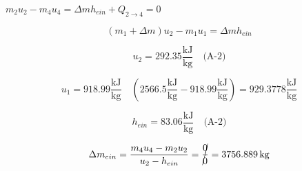 

\item[d)] $m_2 u_2 - m_4 u_4 = \Delta m h_{ein} + Q_{2 \rightarrow 4} = 0$
    
    \[
    (m_1 + \Delta m) u_2 - m_1 u_1 = \Delta m h_{ein}
    \]
    
    \[
    u_2 = 292.35 \frac{\text{kJ}}{\text{kg}} \quad \text{(A-2)}
    \]
    
    \[
    u_1 = 918.99 \frac{\text{kJ}}{\text{kg}} \quad (2566.5 \frac{\text{kJ}}{\text{kg}} - 918.99 \frac{\text{kJ}}{\text{kg}}) = 929.3778 \frac{\text{kJ}}{\text{kg}}
    \]
    
    \[
    h_{ein} = 83.06 \frac{\text{kJ}}{\text{kg}} \quad \text{(A-2)}
    \]
    
    \[
    \Delta m_{ein} = \frac{m_4 u_4 - m_2 u_2}{u_2 - h_{ein}} = \cancel{\frac{0}{0}} = 3756.889 \, \text{kg}
    \]